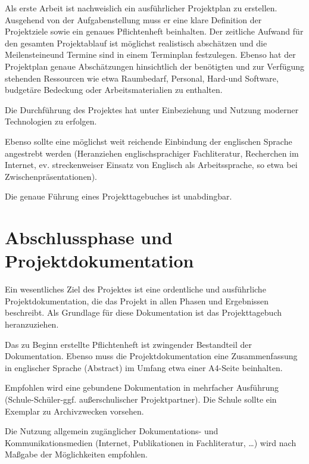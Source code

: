 Als erste Arbeit ist nachweislich ein ausführlicher Projektplan zu erstellen. Ausgehend von der Aufgabenstellung muss er eine klare Definition der Projektziele sowie ein genaues Pflichtenheft beinhalten. Der zeitliche Aufwand für den gesamten Projektablauf ist möglichst realistisch abschätzen und die \glqq Meilensteine\grqq und Termine sind in einem Terminplan festzulegen. Ebenso hat der Projektplan genaue Abschätzungen hinsichtlich der benötigten und zur Verfügung stehenden Ressourcen wie etwa Raumbedarf, Personal, Hard-und Software, budgetäre Bedeckung oder Arbeitsmaterialien zu enthalten.

Die Durchführung des Projektes hat unter Einbeziehung und Nutzung moderner Technologien zu erfolgen.

Ebenso sollte eine möglichst weit reichende Einbindung der englischen Sprache angestrebt werden (Heranziehen englischsprachiger Fachliteratur, Recherchen im Internet, ev. streckenweiser Einsatz von Englisch als Arbeitssprache, so etwa bei Zwischenpräsentationen).

Die genaue Führung eines Projekttagebuches ist unabdingbar.

\section{Abschlussphase und Projektdokumentation}

Ein wesentliches Ziel des Projektes ist eine ordentliche und ausführliche Projektdokumentation, die das Projekt in allen Phasen und Ergebnissen beschreibt. Als Grundlage für diese Dokumentation ist das Projekttagebuch heranzuziehen.
 
Das zu Beginn erstellte Pflichtenheft ist zwingender Bestandteil der Dokumentation.
Ebenso muss die Projektdokumentation eine Zusammenfassung in englischer Sprache (Abstract) im Umfang etwa einer A4-Seite beinhalten.

Empfohlen wird eine gebundene Dokumentation in mehrfacher Ausführung (Schule-Schüler-ggf. außerschulischer Projektpartner). Die Schule sollte ein Exemplar zu Archivzwecken vorsehen.
 
Die Nutzung allgemein zugänglicher Dokumentations- und Kommunikationsmedien (Internet, Publikationen in Fachliteratur, \ldots) wird nach Maßgabe der Möglichkeiten empfohlen.


